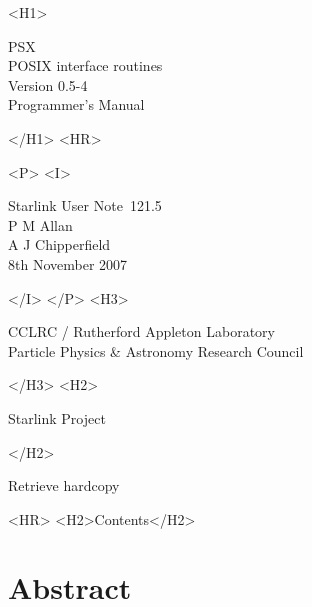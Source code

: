 \documentclass[twoside,11pt]{article}
\newcommand{\stardoccategory}  {Starlink User Note}
\newcommand{\stardocsource}    {sun\stardocnumber}
\newcommand{\stardocnumber}    {121.5}
\newcommand{\stardocauthors}   {P M Allan\\
                                A J Chipperfield}
\newcommand{\stardocdate}      {8th November 2007}
\newcommand{\stardoctitle}     {PSX \\ [1ex]
                                POSIX interface routines}
\newcommand{\stardocversion}   {Version 0.5-4}
\newcommand{\stardocmanual}    {Programmer's Manual}
\newcommand{\htmladdnormallink}[2]{#1}
\newcommand{\htmladdimg}[1]{}
\newcommand{\htmlref}[2]{#1}
\newcommand{\htmladdtonavigation}[1]{}
\newcommand{\xlabel}[1]{}
\renewcommand{\_}{\texttt{\symbol{95}}}
\begin{document}
\begin{htmlonly}
   \xlabel{}
   \begin{rawhtml} <H1> \end{rawhtml}
      \stardoctitle\\
      \stardocversion\\
      \stardocmanual
   \begin{rawhtml} </H1> <HR> \end{rawhtml}


   \begin{rawhtml} <P> <I> \end{rawhtml}
   \stardoccategory\ \stardocnumber \\
   \stardocauthors \\
   \stardocdate
   \begin{rawhtml} </I> </P> <H3> \end{rawhtml}
      \htmladdnormallink{CCLRC / Rutherford Appleton Laboratory}
                        {http://www.cclrc.ac.uk} \\
      \htmladdnormallink{Particle Physics \& Astronomy Research Council}
                        {http://www.pparc.ac.uk} \\
   \begin{rawhtml} </H3> <H2> \end{rawhtml}
      \htmladdnormallink{Starlink Project}{http://www.starlink.ac.uk/}
   \begin{rawhtml} </H2> \end{rawhtml}
   \htmladdnormallink{\htmladdimg{source.gif} Retrieve hardcopy}
      {http://www.starlink.ac.uk/cgi-bin/hcserver?\stardocsource}\\

  \label{stardoccontents}
  \begin{rawhtml}
    <HR>
    <H2>Contents</H2>
  \end{rawhtml}
  \htmladdtonavigation{\htmlref{\htmladdimg{contents_motif.gif}}
        {stardoccontents}}

  \section{\xlabel{abstract}Abstract}
\end{htmlonly}
\end{document}
